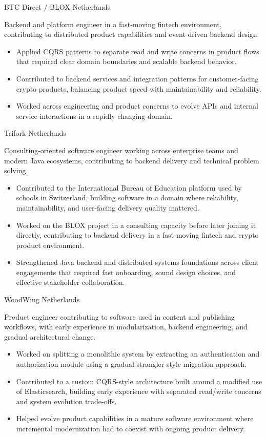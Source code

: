 \documentclass[10pt,a4paper,sans]{moderncv}
\begin{document}
{BTC Direct / BLOX}
{Netherlands}
{}{
Backend and platform engineer in a fast-moving fintech environment, contributing to distributed product capabilities and event-driven backend design.
\begin{itemize}
 \item Applied CQRS patterns to separate read and write concerns in product flows that required clear domain boundaries and scalable backend behavior.
 \item Contributed to backend services and integration patterns for customer-facing crypto products, balancing product speed with maintainability and reliability.
 \item Worked across engineering and product concerns to evolve APIs and internal service interactions in a rapidly changing domain.
\end{itemize}
}

{Trifork}
{Netherlands}
{}{
Consulting-oriented software engineer working across enterprise teams and modern Java ecosystems, contributing to backend delivery and technical problem solving.
\begin{itemize}
 \item Contributed to the International Bureau of Education platform used by schools in Switzerland, building software in a domain where reliability, maintainability, and user-facing delivery quality mattered.
 \item Worked on the BLOX project in a consulting capacity before later joining it directly, contributing to backend delivery in a fast-moving fintech and crypto product environment.
 \item Strengthened Java backend and distributed-systems foundations across client engagements that required fast onboarding, sound design choices, and effective stakeholder collaboration.
\end{itemize}
}

{WoodWing}
{Netherlands}
{}{
Product engineer contributing to software used in content and publishing workflows, with early experience in modularization, backend engineering, and gradual architectural change.
\begin{itemize}
 \item Worked on splitting a monolithic system by extracting an authentication and authorization module using a gradual strangler-style migration approach.
 \item Contributed to a custom CQRS-style architecture built around a modified use of Elasticsearch, building early experience with separated read/write concerns and system evolution trade-offs.
 \item Helped evolve product capabilities in a mature software environment where incremental modernization had to coexist with ongoing product delivery.
\end{itemize}
}
\end{document}

